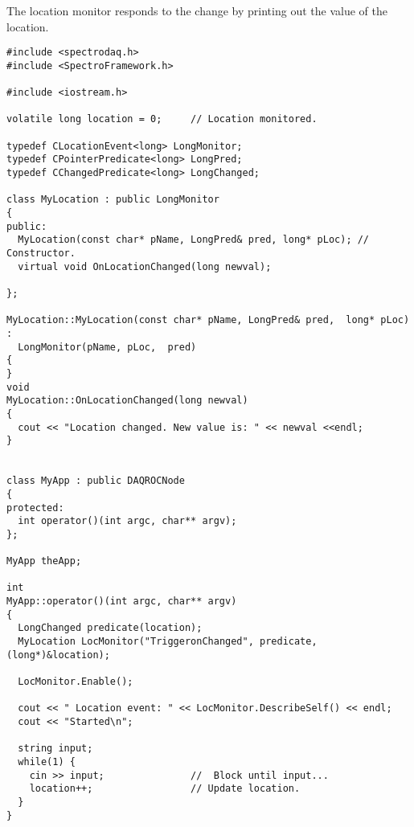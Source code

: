 The location monitor responds to the change by printing out the value of the location.



\footnotesize\begin{verbatim}#include <spectrodaq.h>
#include <SpectroFramework.h>

#include <iostream.h>

volatile long location = 0;     // Location monitored.

typedef CLocationEvent<long> LongMonitor;
typedef CPointerPredicate<long> LongPred;
typedef CChangedPredicate<long> LongChanged;

class MyLocation : public LongMonitor
{
public:
  MyLocation(const char* pName, LongPred& pred, long* pLoc); //  Constructor.
  virtual void OnLocationChanged(long newval);

};

MyLocation::MyLocation(const char* pName, LongPred& pred,  long* pLoc) :
  LongMonitor(pName, pLoc,  pred)
{
}
void
MyLocation::OnLocationChanged(long newval)
{
  cout << "Location changed. New value is: " << newval <<endl;
}


class MyApp : public DAQROCNode
{
protected:
  int operator()(int argc, char** argv);
};

MyApp theApp;

int
MyApp::operator()(int argc, char** argv)
{
  LongChanged predicate(location);
  MyLocation LocMonitor("TriggeronChanged", predicate, (long*)&location);

  LocMonitor.Enable();

  cout << " Location event: " << LocMonitor.DescribeSelf() << endl;
  cout << "Started\n";

  string input;
  while(1) {
    cin >> input;               //  Block until input...
    location++;                 // Update location.
  }
}
\end{verbatim}\normalsize 


